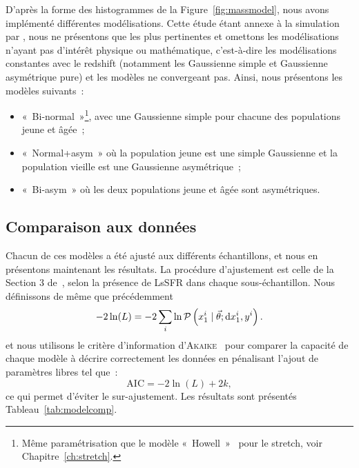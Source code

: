 \documentclass[../main/main.tex]{subfiles}
\begin{document}
D'après la forme des histogrammes de la Figure~\ref{fig:massmodel}, nous avons
implémenté différentes modélisations. Cette étude étant annexe à la simulation
par \snana, nous ne présentons que les plus pertinentes et omettons les
modélisations n'ayant pas d'intérêt physique ou mathématique, c'est-à-dire les
modélisations constantes avec le redshift (notamment les Gaussienne simple et
Gaussienne asymétrique pure) et les modèles ne convergeant pas. Ainsi, nous
présentons les modèles suivants~:

\begin{itemize}
    \item «~Bi-normal~»\footnote{Même paramétrisation que le modèle
            «~Howell~»~\citep{howell2007} pour le stretch, voir
        Chapitre~\ref{ch:stretch}.}, avec une Gaussienne simple pour chacune des
        populations jeune et âgée~;

    \item «~Normal+asym~» où la population jeune est une simple Gaussienne et la
        population vieille est une Gaussienne asymétrique~;

    \item «~Bi-asym~» où les deux populations jeune et âgée sont asymétriques.
\end{itemize}

\subsection{Comparaison aux données}\label{ssec:mres}

Chacun de ces modèles a été ajusté aux différents échantillons, et nous en
présentons maintenant les résultats. La procédure d'ajustement est celle de la
Section 3 de~, selon la présence de LsSFR dans chaque
sous-échantillon. Nous définissons de même que précédemment
\begin{equation}\label{eq:likelihood2}
    -2\ln(L) = -2 \sum_i \ln \mathcal{P}\left(x_1^i \mid \vec{\theta};
    \mathrm{d}x_1^i, y^i\right).
\end{equation}
et nous utilisons le critère d'information
d'\textsc{Akaike}~\citep[AIC,][]{burnham2004} pour comparer la capacité de
chaque modèle à décrire correctement les données en pénalisant l'ajout de
paramètres libres tel que~:
\begin{equation}
    \mathrm{AIC} = -2\ln(L) + 2k,
\end{equation}
ce qui permet d'éviter le sur-ajustement. Les résultats sont présentés
Tableau~\ref{tab:modelcomp}.
\end{document}
